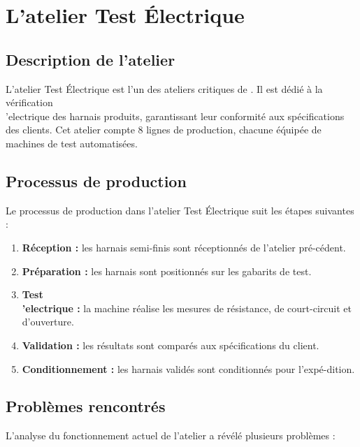 \section{L'atelier Test \'Electrique}

\subsection{Description de l'atelier}

L'atelier Test \'Electrique est l'un des ateliers critiques de \sews. Il est d\'edi\'e \`a la v\'erification \\'electrique des harnais produits, garantissant leur conformit\'e aux sp\'ecifications des clients. Cet atelier compte 8 lignes de production, chacune \'e\'quip\'ee de machines de test automatis\'ees.

\subsection{Processus de production}

Le processus de production dans l'atelier Test \'Electrique suit les \'etapes suivantes :

\begin{enumerate}
    \item \textbf{R\'eception :} les harnais semi-finis sont r\'eceptionn\'es de l'atelier pr\'e-c\'edent.
    \item \textbf{Pr\'eparation :} les harnais sont positionn\'es sur les gabarits de test.
    \item \textbf{Test \\'electrique :} la machine r\'ealise les mesures de r\'esistance, de court-circuit et d'ouverture.
    \item \textbf{Validation :} les r\'esultats sont compar\'es aux sp\'ecifications du client.
    \item \textbf{Conditionnement :} les harnais valid\'es sont conditionn\'es pour l'exp\'e-dition.
\end{enumerate}

\subsection{Probl\`emes rencontr\'es}

L'analyse du fonctionnement actuel de l'atelier a r\'ev\'el\'e plusieurs probl\`emes :

